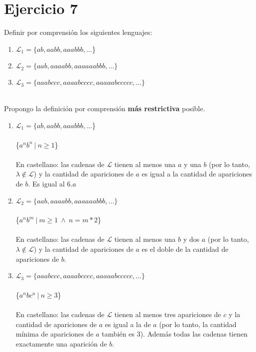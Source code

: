 \documentclass{article}
\begin{document}
{{\section*{Ejercicio 7}{Definir por comprensión los siguientes lenguajes:}
\begin{enumerate}[label=\alph*.,font=\itshape]
    \item {$\mathcal{L}_1 = \{ab, aabb, aaabbb, ...$\}}
    \item {$\mathcal{L}_2 = \{aab, aaaabb, aaaaaabbb, ...\}$}
    \item {$\mathcal{L}_3 = \{aaabccc, aaaabcccc, aaaaabccccc, ...\}$ \\ \\}
\end{enumerate}
{Propongo la definición por comprensión \textbf{más restrictiva} posible.}
\begin{enumerate}[label=\alph*.,font=\itshape]
    \item {$\mathcal{L}_1 = \{ab, aabb, aaabbb, ...$\}}
    \\
    \\
    {\{$a^nb^n \ | \ n \geq 1$\}}
    \\
    \\
    {En castellano: las cadenas de $\mathcal{L}$ tienen al menos una $a$ y una $b$ (por lo tanto, $\lambda \notin \mathcal{L}$) y la cantidad de apariciones de $a$ es igual a la cantidad de apariciones de $b$. Es igual al $6. a$}
    \item {$\mathcal{L}_2 = \{aab, aaaabb, aaaaaabbb, ...\}$}
    \\
    \\
    {\{$a^nb^m \ | \ m \geq 1 \ \land \ n = m * 2$\}}
    \\
    \\
    {En castellano: las cadenas de $\mathcal{L}$ tienen al menos una $b$ y dos $a$ (por lo tanto, $\lambda \notin \mathcal{L}$) y la cantidad de apariciones de $a$ es el doble de la cantidad de apariciones de $b$. }
    \item {$\mathcal{L}_3 = \{aaabccc, aaaabcccc, aaaaabccccc, ...\}$}
    \\
    \\
    {\{$a^nbc^n \ | \ n \geq 3$\}}
    \\
    \\
    {En castellano:  las cadenas de $\mathcal{L}$ tienen al menos tres apariciones de $c$ y la cantidad de apariciones de $a$ es igual a la de $a$ (por lo tanto, la cantidad mínima de apariciones de $a$ también es 3). Además todas las cadenas tienen exactamente una aparición de $b$.}
\end{enumerate}
}}
\end{document}

